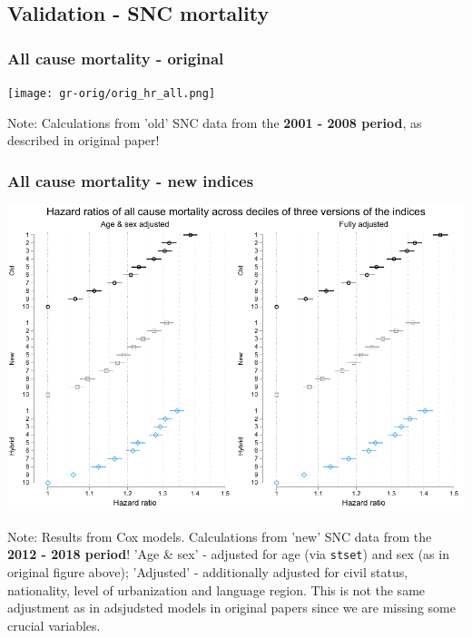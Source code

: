 \documentclass[a4paper, notitlepage, fleqn]{article} %
\begin{document}
\subsection{Validation - SNC mortality}

\subsubsection{All cause mortality - original}

\begin{center}
\texttt{[image: gr-orig/orig\_hr\_all.png]} 
\end{center}

Note: 	Calculations from 'old' SNC data from the \textbf{2001 - 2008 period}, as described in original paper!

\subsubsection{All cause mortality - new indices}
\begin{center}
\includegraphics[width=\textwidth]{gr/sep3.pdf}
\end{center}

Note: 	Results from Cox models. Calculations from 'new' SNC data from the \textbf{2012 - 2018 period}!  
		'Age \& sex' - adjusted for age (via \texttt{stset}) and sex (as in original figure above);  
		'Adjusted' - additionally adjusted for civil status, nationality, level of urbanization and language region.  
		This is not the same adjustment as in adsjudsted models in original papers since we are missing some crucial variables. 
\newpage
\end{document}

